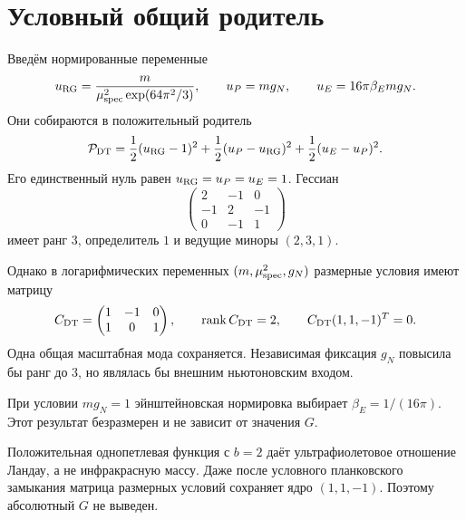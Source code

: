 \section{Условный общий родитель}

Введём нормированные переменные
\begin{equation}
 u_{\rm RG}=\frac{m}{\mu_{\rm spec}^2\exp(64\pi^2/3)},
 \qquad u_P=m g_N,
 \qquad u_E=16\pi\beta_E m g_N.
\end{equation}
Они собираются в положительный родитель
\begin{equation}
 \mathcal P_{\rm DT}
 =\frac12(u_{\rm RG}-1)^2
 +\frac12(u_P-u_{\rm RG})^2
 +\frac12(u_E-u_P)^2.
 \label{eq:v10-newton-dt-parent}
\end{equation}
Его единственный нуль равен $u_{\rm RG}=u_P=u_E=1$. Гессиан
\begin{equation}
 \begin{pmatrix}2&-1&0\\-1&2&-1\\0&-1&1\end{pmatrix}
\end{equation}
имеет ранг $3$, определитель $1$ и ведущие миноры $(2,3,1)$.

Однако в логарифмических переменных $(m,\mu_{\rm spec}^2,g_N)$ размерные
условия имеют матрицу
\begin{equation}
 C_{\rm DT}=
 \begin{pmatrix}1&-1&0\\1&0&1\end{pmatrix},
 \qquad \operatorname{rank} C_{\rm DT}=2,
 \qquad C_{\rm DT}(1,1,-1)^T=0.
 \label{eq:v10-newton-dt-scale-map}
\end{equation}
Одна общая масштабная мода сохраняется. Независимая фиксация $g_N$ повысила
бы ранг до $3$, но являлась бы внешним ньютоновским входом.

\begin{theorem}
При условии $m g_N=1$ эйнштейновская нормировка выбирает
$\beta_E=1/(16\pi)$. Этот результат безразмерен и не зависит от значения
$G$.
\end{theorem}

\begin{nogocriterion}
Положительная однопетлевая функция с $b=2$ даёт ультрафиолетовое отношение
Ландау, а не инфракрасную массу. Даже после условного планковского замыкания
матрица размерных условий сохраняет ядро $(1,1,-1)$. Поэтому абсолютный
$G$ не выведен.
\end{nogocriterion}

